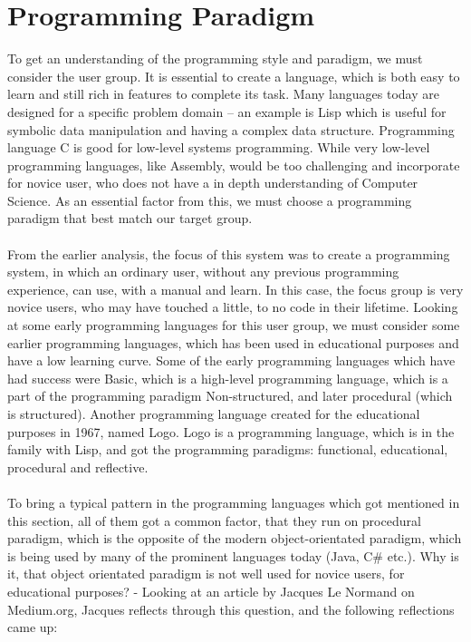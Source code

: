 
\section{Programming Paradigm}
\label{programmingparadigm}
To get an understanding of the programming style and paradigm, we must consider the user group. It is essential to create a language, which is both easy to learn and still rich in features to complete its task. Many languages today are designed for a specific problem domain – an example is Lisp which is useful for symbolic data manipulation and having a complex data structure. Programming language C is good for low-level systems programming. While very low-level programming languages, like Assembly, would be too challenging and incorporate for novice user, who does not have a in depth understanding of Computer Science.
As an essential factor from this, we must choose a programming paradigm that best match our target group.\\
\\
From the earlier analysis, the focus of this system was to create a programming system, in which an ordinary user, without any previous programming experience, can use, with a manual and learn. In this case, the focus group is very novice users, who may have touched a little, to no code in their lifetime. Looking at some early programming languages for this user group, we must consider some earlier programming languages, which has been used in educational purposes and have a low learning curve. Some of the early programming languages which have had success were Basic, which is a high-level programming language, which is a part of the programming paradigm Non-structured, and later procedural (which is structured). Another programming language created for the educational purposes in 1967, named Logo. Logo is a programming language, which is in the family with Lisp, and got the programming paradigms: functional, educational, procedural and reflective.\cite{scott2000programming} \\
\\
To bring a typical pattern in the programming languages which got mentioned in this section, all of them got a common factor, that they run on procedural paradigm, which is the opposite of the modern object-orientated paradigm, which is being used by many of the prominent languages today (Java, C\# etc.). Why is it, that object orientated paradigm is not well used for novice users, for educational purposes? - Looking at an article by Jacques Le Normand on Medium.org, Jacques reflects through this question, and the following reflections came up:\cite{tutlisp}\cite{medlisp} \\
